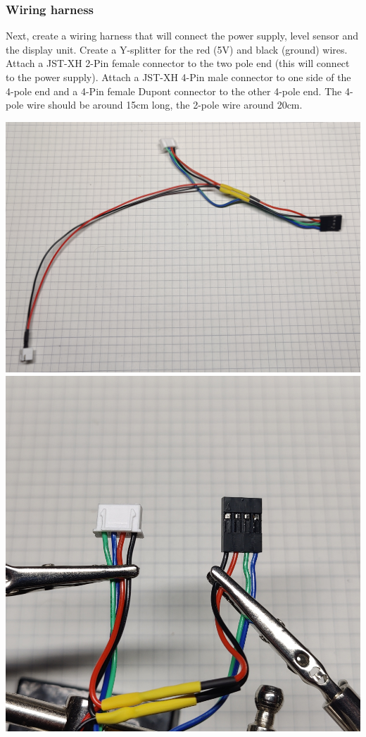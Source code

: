 \documentclass[]{article}
\begin{document}
\subsubsection{Wiring harness}
\begin{minipage}[t]{0.5\linewidth}
	\vspace{0pt}
	Next, create a wiring harness that will connect the power supply, level sensor and the display unit. Create a Y-splitter for the red (5V) and black (ground) wires. Attach a JST-XH 2-Pin female connector to the two pole end (this will connect to the power supply). Attach a JST-XH 4-Pin male connector to one side of the 4-pole end and a 4-Pin female Dupont connector to the other 4-pole end. The 4-pole wire should be around 15cm long, the 2-pole wire around 20cm.
\end{minipage}
\hfill
\begin{minipage}[t]{0.4\linewidth}
	\vspace{0pt}
	\includegraphics[width=\linewidth]{images/02_wiring/04_wiretree.jpg}
	\includegraphics[width=\linewidth]{images/02_wiring/05_wiretree_plugs.jpg}
\end{minipage}
\end{document}
